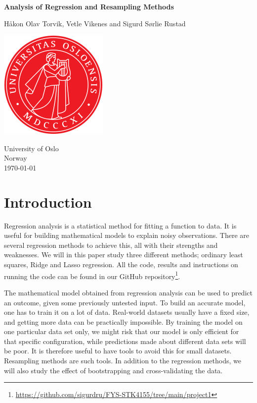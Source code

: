 \documentclass[reprint,english,notitlepage,aps,nobalancelastpage,nofootinbib]{revtex4-1}  %
\begin{document}
\begin{titlepage}
	\begin{center}
	\textbf{Analysis of Regression and Resampling Methods}

	\vspace{0.2cm}
	Håkon Olav Torvik, Vetle Vikenes and Sigurd Sørlie Rustad

	\vspace{0.5cm}
	\includegraphics[scale=0.5]{../../pictures/UIO}
	\vspace{0.8cm}

	University of Oslo\\
	Norway\\
	\today	\\
	\end{center}
	\tableofcontents
	\clearpage
\end{titlepage}

\onecolumngrid
\section*{Introduction}

Regression analysis is a statistical method for fitting a function to data. It is useful for building mathematical models to explain noisy observations. There are several regression methods to achieve this, all with their strengths and weaknesses. We will in this paper study three different methods; ordinary least squares, Ridge and Lasso regression. All the code, results and instructions on running the code can be found in our GitHub repository\footnote{\href{https://github.com/sigurdru/FYS-STK4155/tree/main/project1}{https://github.com/sigurdru/FYS-STK4155/tree/main/project1}}.

The mathematical model obtained from regression analysis can be used to predict an outcome, given some previously untested input. To build an accurate model, one has to train it on a lot of data. Real-world datasets usually have a fixed size, and getting more data can be practically impossible. By training the model on one particular data set only, we might risk that our model is only efficient for that specific configuration, while predictions made about different data sets will be poor. It is therefore useful to have tools to avoid this for small datasets. Resampling methods are such tools. In addition to the regression methods, we will also study the effect of bootstrapping and cross-validating the data.
\end{document}
